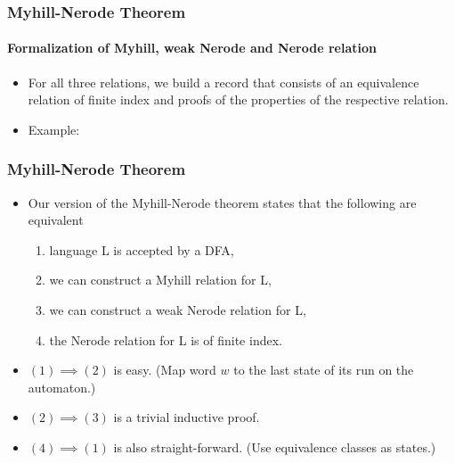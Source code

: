 \documentclass{beamer}
\begin{document}
\begin{frame}
    \frametitle{Myhill-Nerode Theorem}
    \framesubtitle{Formalization of Myhill, weak Nerode and Nerode relation}
    \begin{itemize}
        \item For all three relations, we build a record that consists of an equivalence relation of finite index and proofs of the properties of the respective relation. 
        \item Example:
    \end{itemize}
\end{frame}

\begin{frame}
    \frametitle{Myhill-Nerode Theorem}
    \begin{itemize}
        \item Our version of the Myhill-Nerode theorem states that the following are equivalent
            \begin{enumerate}
                \item language L is accepted by a DFA,
                \item we can construct a Myhill relation for L,
                \item we can construct a weak Nerode relation for L,
                \item the Nerode relation for L is of finite index.
            \end{enumerate}
        \item 
            $(1) \implies (2)$ is easy. (Map word $w$ to the last state of its run on the automaton.)
        \item 
            $(2) \implies (3)$ is a trivial inductive proof. 
        \item
            $(4) \implies (1)$ is also straight-forward. (Use equivalence classes as states.)
    \end{itemize}
\end{frame}
\end{document}
